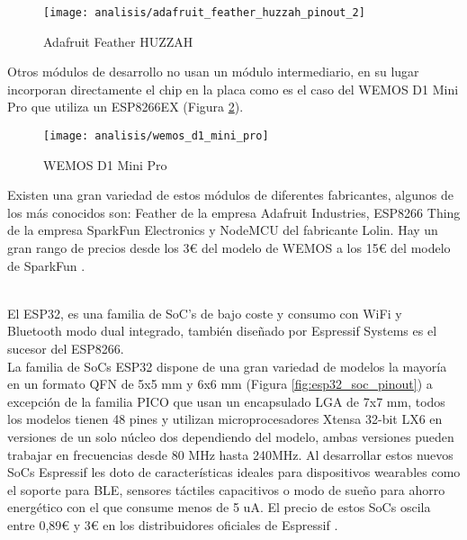 \documentclass[../proyecto.tex]{subfiles}
\begin{document}
\begin{figure}[H]
\centering
\texttt{[image: analisis/adafruit\_feather\_huzzah\_pinout\_2]}
\caption{Adafruit Feather HUZZAH}
\label{fig:adafruit_feather_huzzah_pinout_2}
\end{figure}

Otros módulos de desarrollo no usan un módulo intermediario, en su lugar incorporan directamente el chip en la placa como es el caso del WEMOS D1 Mini Pro \cite{wemos_d1_mini_pro} que utiliza un ESP8266EX (Figura \ref{fig:wemos_d1_mini_pro}).\\

\begin{figure}[h]
\centering
\texttt{[image: analisis/wemos\_d1\_mini\_pro]}
\caption{WEMOS D1 Mini Pro}
\label{fig:wemos_d1_mini_pro}
\end{figure}

Existen una gran variedad de estos módulos de diferentes fabricantes, algunos de los más conocidos son:  Feather de la empresa Adafruit Industries, ESP8266 Thing de la empresa SparkFun Electronics y NodeMCU del fabricante Lolin. Hay un gran rango de precios desde los 3€ del modelo de WEMOS a los 15€ del modelo de SparkFun \cite{espressif_provider_digikey} \cite{espressif_provider_mouser}\cite{sparkfun_thing_official_page}.\\

\pagebreak

\\
El ESP32, es una familia de SoC's de bajo coste y consumo con WiFi y Bluetooth modo dual integrado, también diseñado por Espressif Systems \cite{esp32_overview} es el sucesor del ESP8266.\\

La familia de SoCs ESP32 dispone de una gran variedad de modelos la mayoría en un formato QFN de 5x5 mm y 6x6 mm (Figura \ref{fig:esp32_soc_pinout}) a excepción de la familia PICO que usan un encapsulado LGA de 7x7 mm, todos los modelos tienen 48 pines y utilizan microprocesadores Xtensa 32-bit LX6 en versiones de un solo núcleo dos dependiendo del modelo, ambas versiones pueden trabajar en frecuencias desde 80 MHz hasta 240MHz. Al desarrollar estos nuevos SoCs Espressif les doto de características ideales para dispositivos wearables como el soporte para BLE, sensores táctiles capacitivos o modo de sueño para ahorro energético con el que consume menos de 5  uA. El precio de estos SoCs oscila entre 0,89€ y 3€ en los distribuidores oficiales de Espressif \cite{espressif_provider_digikey} \cite{espressif_provider_mouser}.\\
\end{document}
